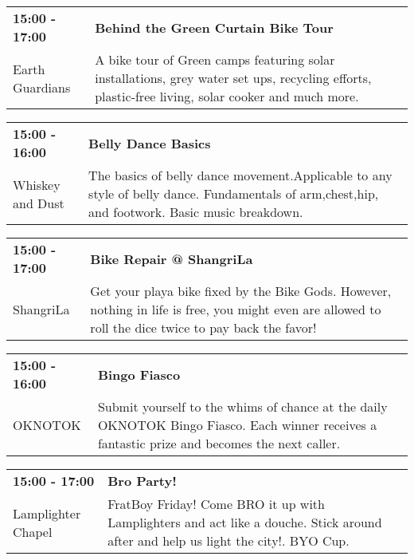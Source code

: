\begin{tabular}{ p{1in} p{2.2in} }
    \textbf{15:00 - 17:00} & \textbf{Behind the Green Curtain Bike Tour} \\
    Earth Guardians \newline  & A bike tour of Green camps featuring solar installations, grey water set ups, recycling efforts, plastic-free living, solar cooker and much more. \\
    \hline 
\end{tabular}
    
\begin{tabular}{ p{1in} p{2.2in} }
    \textbf{15:00 - 16:00} & \textbf{Belly Dance Basics} \\
    Whiskey and Dust \newline  & The basics of belly dance movement.Applicable to any style of belly dance. Fundamentals of arm,chest,hip, and footwork. Basic music breakdown. \\
    \hline 
\end{tabular}
    
\begin{tabular}{ p{1in} p{2.2in} }
    \textbf{15:00 - 17:00} & \textbf{Bike Repair @ ShangriLa} \\
    ShangriLa \newline  & Get your playa bike fixed by the Bike Gods. However, nothing in life is free, you might even are allowed to roll the dice twice to pay back the favor! \\
    \hline 
\end{tabular}
    
\begin{tabular}{ p{1in} p{2.2in} }
    \textbf{15:00 - 16:00} & \textbf{Bingo Fiasco} \\
    OKNOTOK \newline  & Submit yourself to the whims of chance at the daily OKNOTOK Bingo Fiasco. Each winner receives a fantastic prize and becomes the next caller. \\
    \hline 
\end{tabular}
    
\begin{tabular}{ p{1in} p{2.2in} }
    \textbf{15:00 - 17:00} & \textbf{Bro Party!} \\
    Lamplighter Chapel \newline  & FratBoy Friday! Come BRO it up with Lamplighters and act like a douche. Stick around after and help us light the city!. BYO Cup. \\
    \hline 
\end{tabular}
    
